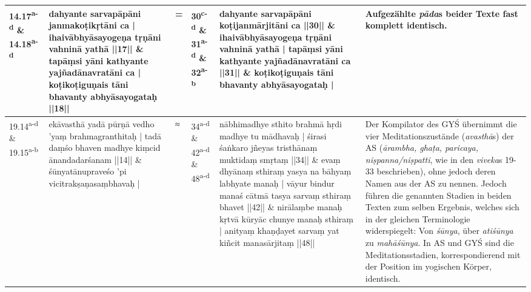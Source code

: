 \documentclass[a4paper,12pt]{article}
\begin{document}
{\begin{tabularx}{\textwidth}{p{}|p{}|p{}|p{}|p{}|p{}}
\hline
14.17\textsuperscript{a-d} \& 14.18\textsuperscript{a-d} & dahyante sarvapāpāni \textbf{janmakoṭikṛtāni} ca | ihaivābhyāsayogeṇa tṛṇāni vahninā yathā ||17|| \newline \& \newline tapāṃsi yāni kathyante yajñadānavratāni ca | koṭikoṭiguṇais tāni bhavanty abhyāsayogataḥ ||18|| & = & 30\textsuperscript{c-d} \& 31\textsuperscript{a-d} \& 32\textsuperscript{a-b} & dahyante sarvapāpāni \textbf{koṭijanmārjitāni} ca ||30|| \newline \& \newline  ihaivābhyāsayogeṇa tṛṇāni vahninā yathā | tapāṃsi yāni kathyante yajñadānavratāni ca ||31|| \newline \& \newline koṭikoṭiguṇais tāni bhavanty abhyāsayogataḥ | & Aufgezählte \textit{pāda}s beider Texte fast komplett identisch. \\

\hline
19.14\textsuperscript{a-d} \& 19.15\textsuperscript{a-b} & ekāvasthā yadā pūrṇā vedho 'yaṃ brahmagranthitaḥ | tadā daṃśo bhaven madhye kiṃcid ānandadarśanam ||14|| \newline \& \newline śūnyatānupraveśo 'pi vicitrakṣaṇasaṃbhavaḥ | & ≈ & 34\textsuperscript{a-d} \& 42\textsuperscript{a-d} \& 48\textsuperscript{a-d} & nābhimadhye sthito brahmā hṛdi madhye tu mādhavaḥ | śirasi śaṅkaro jñeyas tristhānaṃ muktidaṃ smṛtaṃ ||34|| \newline \& \newline evaṃ dhyānaṃ sthiraṃ yasya na bāhyaṃ labhyate manaḥ | vāyur bindur manaś cātmā tasya sarvaṃ sthiraṃ bhavet ||42|| \newline \& \newline nirālaṃbe manaḥ kṛtvā kūryāc chunye manaḥ sthiraṃ | anityaṃ khaṇḍayet sarvaṃ yat kiñcit manasārjitaṃ ||48|| & Der Kompilator des GYŚ übernimmt die vier Meditationszustände (\textit{avasthā}s) der AS (\textit{ārambha, ghaṭa, paricaya, niṣpanna/niṣpatti}, wie in den \textit{viveka}s 19-33 beschrieben), ohne jedoch deren Namen aus der AS zu nennen. Jedoch führen die genannten Stadien in beiden Texten zum selben Ergebnis, welches sich in der gleichen Terminologie widerspiegelt: Von \textit{śūnya}, über \textit{atiśūnya} zu \textit{mahāśūnya}. In AS und GYŚ sind die Meditationsstadien, korrespondierend mit der Position im yogischen Körper, identisch. \\      


\end{tabularx}}
\end{document}
